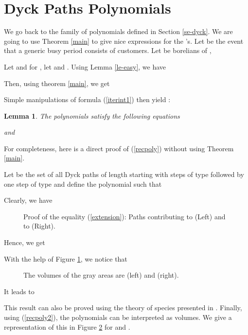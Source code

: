\documentclass[11pt,a4paper]{article}
\numberwithin{equation}{section}
\newtheorem{lem}[prop]{Lemma}
\newcommand{\1}{\mathbbm{1}}
\begin{document}
\section{Dyck Paths Polynomials}
We go back to the family of polynomials  defined in Section
\ref{se-dyck}. We are going to use Theorem \ref{main} to give nice expressions for the 's.
Let  be the event that a generic busy period consists of
 customers.
Let  be borelians of ,

Let  and for
, let  and . Using Lemma \ref{le-easy}, we have

Then, using theorem \ref{main}, we get

Simple manipulations of formula (\ref{iterint1}) then yield :
\begin{lem}\label{recursion}
The polynomials  satisfy the following equations

and

\end{lem}
For completeness, here is a direct proof of (\ref{recpoly}) without using Theorem \ref{main}.

Let  be the set of all Dyck paths of length  starting
with  steps of type  followed by one step of type 
and define the polynomial  such that

Clearly, we have

\begin{figure}[h]

\caption{Proof of the equality (\ref{extension}):  Paths contributing to  (Left) and to  (Right).}
\label{extend}
\end{figure}
Hence, we get

With the help of Figure \ref{extend}, we notice that

\begin{figure}[hbt]

\caption{The volumes of the gray areas are  (left) and
   (right).}
\label{Volume}
\end{figure}

It leads to


This result can also be proved using the theory of species presented in \cite{Leroux}.
Finally, using (\ref{recpoly2}), the polynomials  can be interpreted as volumes. We give a
representation of this in Figure \ref{Volume} for  and .
\end{document}
